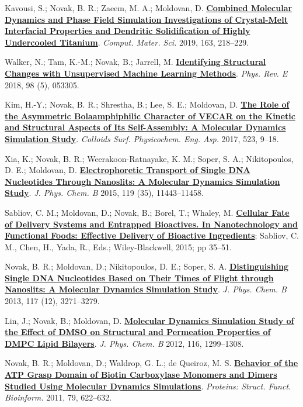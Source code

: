 \begin{cventries}
{\begin{cvitems}
        \item {Kavousi, S.; Novak, B. R.; Zaeem, M. A.; Moldovan, D. \href{https://doi.org/10.1016/j.commatsci.2019.03.024}{\textbf{Combined Molecular Dynamics and Phase Field Simulation Investigations of Crystal-Melt Interfacial Properties and Dendritic Solidification of Highly Undercooled Titanium}}. \textit{Comput. Mater. Sci.} 2019, 163, 218–229.}
       \item {Walker, N.; Tam, K.-M.; Novak, B.; Jarrell, M. \href{https://doi.org/10.1103/PhysRevE.98.053305}{\textbf{Identifying Structural Changes with Unsupervised Machine Learning Methods}}. \textit{Phys. Rev. E} 2018, 98 (5), 053305.}
        \item {Kim, H.-Y.; Novak, B. R.; Shrestha, B.; Lee, S. E.; Moldovan, D. \href{https://doi.org/10.1016/j.colsurfa.2017.03.060}{\textbf{The Role of the Asymmetric Bolaamphiphilic Character of VECAR on the Kinetic and Structural Aspects of Its Self-Assembly: A Molecular Dynamics Simulation Study}}. \textit{Colloids Surf. Physicochem. Eng. Asp.} 2017, 523, 9–18.}
        \item {Xia, K.; Novak, B. R.; Weerakoon-Ratnayake, K. M.; Soper, S. A.; Nikitopoulos, D. E.; Moldovan, D. \href{https://doi.org/10.1021/acs.jpcb.5b02798}{\textbf{Electrophoretic Transport of Single DNA Nucleotides Through Nanoslits: A Molecular Dynamics Simulation Study}}. \textit{J. Phys. Chem. B} 2015, 119 (35), 11443–11458. }
        \item {Sabliov, C. M.; Moldovan, D.; Novak, B.; Borel, T.; Whaley, M. \href{https://onlinelibrary.wiley.com/doi/pdf/10.1002/9781118462157#page=47}{\textbf{Cellular Fate of Delivery Systems and Entrapped Bioactives. In Nanotechnology and Functional Foods: Effective Delivery of Bioactive Ingredients}}; Sabliov, C. M., Chen, H., Yada, R., Eds.; Wiley-Blackwell, 2015; pp 35–51.}
        \item {Novak, B. R.; Moldovan, D.; Nikitopoulos, D. E.; Soper, S. A. \href{https://doi.org/10.1021/jp309486c}{\textbf{Distinguishing Single DNA Nucleotides Based on Their Times of Flight through Nanoslits: A Molecular Dynamics Simulation Study}}. \textit{J. Phys. Chem. B} 2013, 117 (12), 3271–3279. }
        \item {Lin, J.; Novak, B.; Moldovan, D. \href{https://doi.org/10.1021/jp208145b}{\textbf{Molecular Dynamics Simulation Study of the Effect of DMSO on Structural and Permeation Properties of DMPC Lipid Bilayers}}. \textit{J. Phys. Chem. B} 2012, 116, 1299–1308. }
        \item {Novak, B. R.; Moldovan, D.; Waldrop, G. L.; de Queiroz, M. S. \href{https://doi.org/10.1002/prot.22910}{\textbf{Behavior of the ATP Grasp Domain of Biotin Carboxylase Monomers and Dimers Studied Using Molecular Dynamics Simulations}}. \textit{Proteins: Struct. Funct. Bioinform.} 2011, 79, 622–632.}

\end{cvitems}}
\end{cventries}
